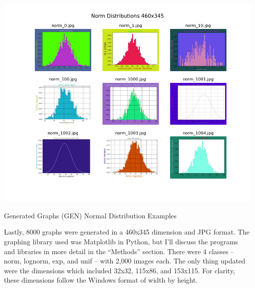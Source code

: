 \documentclass[12pt]{article}
\begin{document}
            \begin{table}[h]
                
                \begin{center}

                    \includegraphics[scale=0.6]{norm_460x345_overview.png}
                    \caption{Generated Graphs (GEN) Normal Distribution Examples}
                    \label{generated-overview}
        
                \end{center}
                
            \end{table}

            Lastly, 8000 graphs were generated in a 460x345 dimension and JPG format. 
            The graphing library used was Matplotlib in Python, 
            but I’ll discuss the programs and libraries in more detail in the “Methods” section. 
            There were 4 classes -- norm, lognorm, exp, and unif -- with 2,000 images each. 
            The only thing updated were the dimensions which included 32x32, 115x86, and 153x115. 
            For clarity, these dimensions follow the Windows format of width by height.
\end{document}
